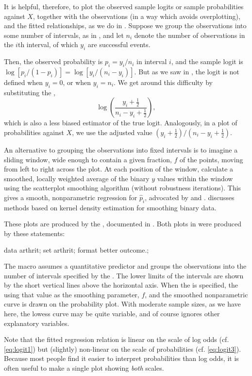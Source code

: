 It is helpful, therefore, to plot the observed sample logits or
sample probabilities against $X$, together with the observations
(in a way which avoids overplotting), and the fitted relationships,
as we do in .
Suppose we group the observations into some number of intervals,
as in ,
and let $n_i$ denote the number of observations in the $i$th
interval, of which $y_i$ are successful events.

Then, the observed probability is $p_i = y_i / n_i$ in interval $i$,
and the sample logit is
$\log[ p_i / (1 - p_i) ] = \log[ y_i / (n_i - y_i)]$.
But as we saw in , the logit is not defined
when $y_i =0$, or when $y_i = n_i$.
We get around this difficulty by substituting the
,
\begin{equation*}
 \log \left( \frac{y_i + \frac12}{n_i - y_i + \frac12} \right)
 \comma
\end{equation*}
which is also a less biased estimator of the true logit.  Analogously, in
a plot of probabilities against $X$, we use the adjusted value
$ (y_i + \frac12) / (n_i - y_i + \frac12)$.

An alternative to grouping the observations into fixed intervals is to
imagine a sliding window, wide enough to contain a given fraction,
$f$ of the points, moving from left to right across the plot.
At each position of the window,  calculate a smoothed, locally weighted
average of the binary $y$ values within the window using the
 scatterplot smoothing algorithm
\citep{Cleveland:79} (without robustness iterations).
This gives a smooth, nonparametric regression for $\hat{p}_i$,
advocated by \citet{Landwehr-etal:84} and \citet{Fowlkes:87}.
\citet{Copas:83} discusses methods based on kernel density estimation
for smoothing binary data.

These plots are produced by the , documented in
.
Both plots in 
were produced by these statements:
\begin{listing}
data arthrit;
   set arthrit;
   format better outcome.;
\end{listing}

The macro assumes a quantitative predictor and groups the observations
into the number of intervals specified by the .
The lower limits of the intervals are shown by the short vertical lines
above the horizontal axis.
When the   is specified, the 
\citep[App. A1.9]{Friendly:91} using that value as the smoothing parameter,
$f$, and the smoothed nonparametric curve is drawn on the probability
plot.
With moderate sample sizes, as we have here, the lowess curve may be quite
variable, and of course ignores other explanatory variables.

Note that the fitted regression relation is linear on the scale of log odds
(cf. \eqref{eq:logit1})
but (slightly) non-linear on the scale of probabilities
(cf. \eqref{eq:logit3}).
Because most people find it easier to interpret probabilities than log odds,
it is often useful to make a single plot showing \emph{both} scales.

